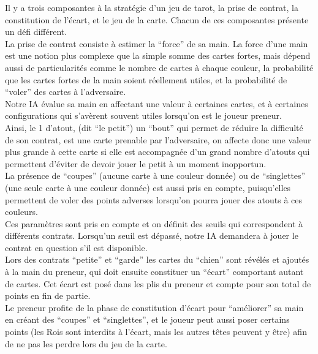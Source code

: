 \documentclass[a4paper]{report}
\begin{document}
Il y a trois composantes à la stratégie d’un jeu de tarot, la prise de contrat, la constitution de l’écart, et le jeu de la carte. Chacun de ces composantes présente un défi différent.\\

La prise de contrat consiste à estimer la “force” de sa main. La force d’une main est une notion plus complexe que la simple somme des cartes fortes, mais dépend aussi de particularités comme le nombre de cartes à chaque couleur, la probabilité que les cartes fortes de la main soient réellement utiles, et la probabilité de “voler” des cartes à l’adversaire.\\

Notre IA évalue sa main en affectant une valeur à certaines cartes, et à certaines configurations qui s’avèrent souvent utiles lorsqu’on est le joueur preneur.\\
Ainsi, le 1 d’atout, (dit “le petit”) un “bout” qui permet de réduire la difficulté de son contrat, est une carte prenable par l’adversaire, on affecte donc une valeur plus grande à cette carte si elle est accompagnée d’un grand nombre d’atouts qui permettent d’éviter de devoir jouer le petit à un moment inopportun.\\
La présence de “coupes” (aucune carte à une couleur donnée) ou de “singlettes” (une seule carte à une couleur donnée) est aussi pris en compte, puisqu’elles permettent de voler des points adverses lorsqu’on pourra jouer des atouts à ces couleurs.\\

Ces paramètres sont pris en compte et on définit des seuils qui correspondent à différents contrats. Lorsqu’un seuil est dépassé, notre IA demandera à jouer le contrat en question s’il est disponible.\\


Lors des contrats “petite” et “garde” les cartes du “chien” sont révélés et ajoutés à la main du preneur, qui doit ensuite constituer un “écart” comportant autant de cartes. Cet écart est posé dans les plis du preneur et compte pour son total de points en fin de partie.\\

Le preneur profite de la phase de constitution d’écart pour “améliorer” sa main en créant des “coupes” et “singlettes”, et le joueur peut aussi poser certains points (les Rois sont interdits à l’écart, mais les autres têtes peuvent y être) afin de ne pas les perdre lors du jeu de la carte.\\
\end{document}
